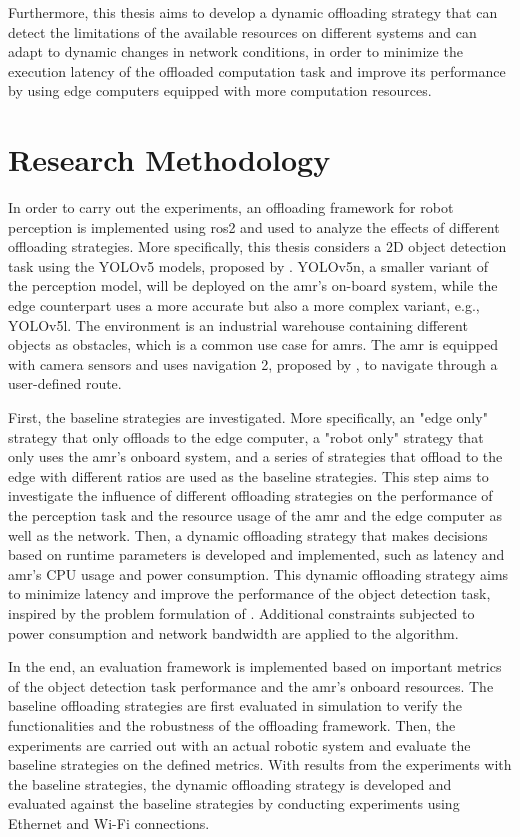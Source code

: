  Furthermore, this thesis aims to develop a dynamic offloading strategy that can detect the limitations of the available resources on different systems and can adapt to dynamic changes in network conditions, in order to minimize the execution latency of the offloaded computation task and improve its performance by using edge computers equipped with more computation resources.

\section{Research Methodology}\label{sec:research_methodology}

In order to carry out the experiments, an offloading framework for robot perception is implemented using \gls{ros}2 \cite{Macenski2022} and used to analyze the effects of different offloading strategies. More specifically, this thesis considers a 2D object detection task using the YOLOv5 models, proposed by \citeauthor*{Jocher2022} \cite{Jocher2022}. YOLOv5n, a smaller variant of the perception model, will be deployed on the \gls{amr}'s on-board system, while the edge counterpart uses a more accurate but also a more complex variant, e.g., YOLOv5l. The environment is an industrial warehouse containing different objects as obstacles, which is a common use case for \glspl{amr}. The \gls{amr} is equipped with camera sensors and uses navigation 2, proposed by \citeauthor*{Macenski2020} \cite{Macenski2020}, to navigate through a user-defined route.

First, the baseline strategies are investigated. More specifically, an "edge only" strategy that only offloads to the edge computer, a "robot only" strategy that only uses the \gls{amr}'s onboard system, and a series of strategies that offload to the edge with different ratios are used as the baseline strategies. This step aims to investigate the influence of different offloading strategies on the performance of the perception task and the resource usage of the \gls{amr} and the edge computer as well as the network. Then, a dynamic offloading strategy that makes decisions based on runtime parameters is developed and implemented, such as latency and \gls{amr}'s CPU usage and power consumption. This dynamic offloading strategy aims to minimize latency and improve the performance of the object detection task, inspired by the problem formulation of \citeauthor*{Ning2019} \cite{Ning2019}. Additional constraints subjected to power consumption and network bandwidth are applied to the algorithm. 

In the end, an evaluation framework is implemented based on important metrics of the object detection task performance and the \gls{amr}'s onboard resources. The baseline offloading strategies are first evaluated in simulation to verify the functionalities and the robustness of the offloading framework. Then, the experiments are carried out with an actual robotic system and evaluate the baseline strategies on the defined metrics. With results from the experiments with the baseline strategies, the dynamic offloading strategy is developed and evaluated against the baseline strategies by conducting experiments using Ethernet and Wi-Fi connections. 
